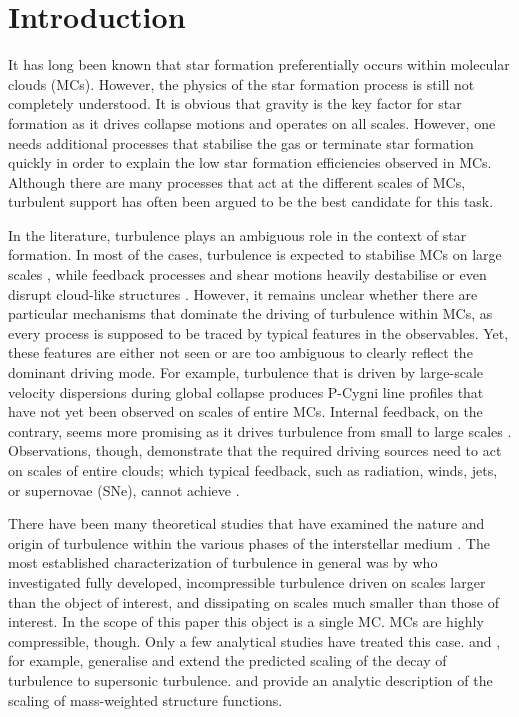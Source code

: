 \section{Introduction}\label{intro}

It has long been known that star formation preferentially occurs within molecular clouds (MCs). 
However, the physics of the star formation process is still not completely understood.
It is obvious that gravity is the key factor for star formation as it drives collapse motions and operates on all scales.
However, one needs additional processes that stabilise the gas or terminate star formation quickly in order to explain the low star formation efficiencies observed in MCs. 
Although there are many processes that act at the different scales of MCs, turbulent support has often been argued to be the best candidate for this task.

In the literature, turbulence plays an ambiguous role in the context of star formation. 
In most of the cases, turbulence is expected to stabilise MCs on large scales \citep{Fleck1980,McKee1992,MacLow2003}, while feedback processes and shear motions heavily destabilise or even disrupt cloud-like structures \citep{Tan2013,Miyamoto2014}. 
However, it remains unclear whether there are particular mechanisms that dominate the driving of turbulence within MCs, as every process is supposed to be traced by typical features in the observables.
Yet, these features are either not seen or are too ambiguous to clearly reflect the dominant driving mode.
For example, turbulence that is driven by large-scale velocity dispersions during global collapse \citep{Ballesteros2011a,Ballesteros2011b,Hartmann2012} produces P-Cygni line profiles that have not yet been observed on scales of entire MCs. 
Internal feedback, on the contrary, seems more promising as it drives turbulence from small to large scales \citep{Dekel2013,Krumholz2014}.
Observations, though, demonstrate that the required driving sources need to act on scales of entire clouds; which typical feedback, such as radiation, winds, jets, or supernovae (SNe), cannot achieve \citep{Heyer2004,Brunt2009,Brunt2013}.

There have been many theoretical studies that have examined the nature and origin of turbulence within the various phases of the interstellar medium \citep[ISM;][and references within]{MacLow2004}. 
The most established characterization of turbulence in general was by \citet{Kolmogorov1941} who investigated fully developed, incompressible turbulence driven on scales larger than the object of interest, and dissipating on scales much smaller than those of interest.
In the scope of this paper this object is a single MC. 
MCs are highly compressible, though.
Only a few analytical studies have treated this case.
\citet{She1994} and \citet{Boldyrev2002}, for example, generalise and extend the predicted scaling of the decay of turbulence to supersonic turbulence.
\citet{Galtier2011} and \citet{Banerjee2013} provide an analytic description of the scaling of mass-weighted structure functions.

